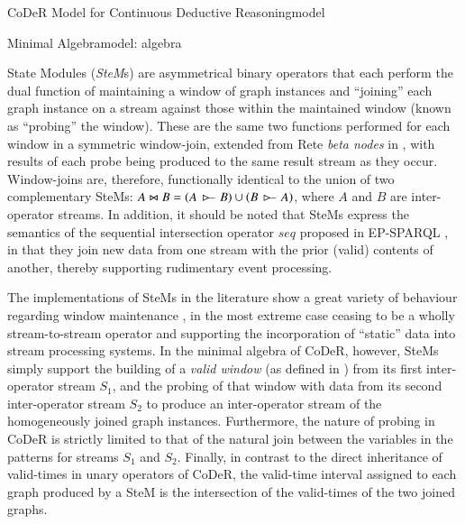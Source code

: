 \begin{nestedsection}{CoDeR Model for Continuous Deductive Reasoning}{model}
\begin{nestedsection}{Minimal Algebra}{model: algebra}
\begin{description}
				State Modules (\emph{SteM}s) are asymmetrical binary operators that each perform the dual function of maintaining a window of graph instances and ``joining'' each graph instance on a stream against those within the maintained window (known as ``probing'' the window).
				These are the same two functions performed for each window in a symmetric window-join, extended from Rete \emph{beta nodes} in \citep{ReteDBMS}, with results of each probe being produced to the same result stream as they occur.
				Window-joins are, therefore, functionally identical to the union of two complementary SteMs:
				${A \Join B = \left( A\,\rstreamjoin\,B \right) \cup \left( B\,\rstreamjoin\,A \right)}$, where $A$ and $B$ are inter-operator streams.
				In addition, it should be noted that SteMs express the semantics of the sequential intersection operator ${seq}$ proposed in EP-SPARQL \citep{EP-SPARQL}, in that they join new data from one stream with the prior (valid) contents of another, thereby supporting rudimentary event processing.

				The implementations of SteMs in the literature show a great variety of behaviour regarding window maintenance \citep{SteMs}, in the most extreme case ceasing to be a wholly stream-to-stream operator and supporting the incorporation of ``static'' data into stream processing systems.
				In the minimal algebra of CoDeR, however, SteMs simply support the building of a \emph{valid window} (as defined in ) from its first inter-operator stream $S_1$, and the probing of that window with data from its second inter-operator stream $S_2$ to produce an inter-operator stream of the homogeneously joined graph instances.
				Furthermore, the nature of probing in CoDeR is strictly limited to that of the natural join between the variables in the patterns for streams $S_1$ and $S_2$.
				Finally, in contrast to the direct inheritance of valid-times in unary operators of CoDeR, the valid-time interval assigned to each graph produced by a SteM is the intersection of the valid-times of the two joined graphs.
		\end{description}


\end{nestedsection}
\end{nestedsection}
